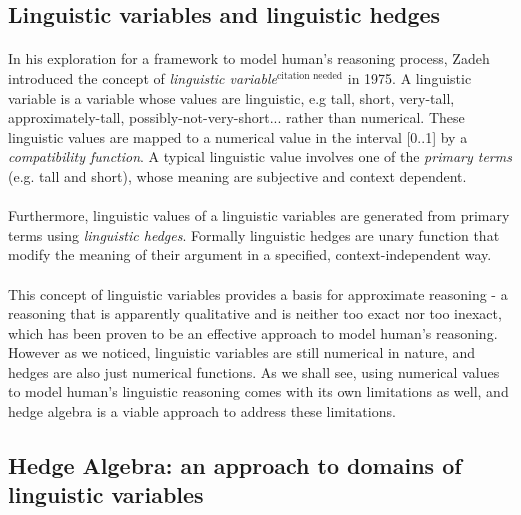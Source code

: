\documentclass[../gr-final.tex]{subfiles}
\begin{document}
\subsection{Linguistic variables and linguistic hedges}
\paragraph{} In his exploration for a framework to model human's
reasoning process, Zadeh introduced the concept of {\em linguistic
variable}$^{\text {citation needed}}$ in 1975. A linguistic
variable is a variable whose values are linguistic, e.g tall,
short, very-tall, approximately-tall, possibly-not-very-short...
rather than numerical. These linguistic values are mapped to a
numerical value in the interval [0..1] by a {\em compatibility
function}. A typical linguistic value involves one of the {\em
primary terms} (e.g. tall and short), whose meaning are
subjective and context dependent.
\paragraph{} Furthermore, linguistic values of a linguistic
variables are generated from primary terms using {\em linguistic
hedges}. Formally linguistic hedges are unary function that
modify the meaning of their argument in a specified,
context-independent way.
\paragraph{} This concept of linguistic variables provides a
basis for approximate reasoning - a reasoning that is apparently
qualitative and is neither too exact nor too inexact, which has
been proven to be an effective approach to model human's
reasoning. However as we noticed, linguistic variables are still
numerical in nature, and hedges are also just numerical
functions. As we shall see, using numerical values to model
human's linguistic reasoning comes with its own limitations as
well, and hedge algebra is a viable approach to address these
limitations.
\subsection{Hedge Algebra: an approach to domains of linguistic
variables}
\end{document}
